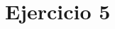 \documentclass[../../e3_tp2_main.tex]{subfiles}
\begin{document}
\chapter{Ejercicio 5}
\end{document}
